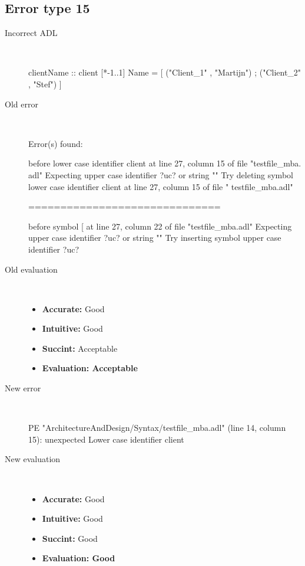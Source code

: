 \hrulefill

\subsection{Error type 15}
  \begin{description}
  \item[Incorrect ADL]~\\
\begin{adl}
clientName :: client [*-1..1] Name =
    [ ("Client_1"      , "Martijn")
    ; ("Client_2"      , "Stef")
    ]\end{adl}
  \item[Old error]~\\
\begin{haskell}
Error(s) found:

before lower case identifier client at line 27, column 15 of file "testfile_mba.
adl"
Expecting upper case identifier ?uc? or string ""
Try deleting symbol lower case identifier client at line 27, column 15 of file "
testfile_mba.adl"

==============================

before symbol [ at line 27, column 22 of file "testfile_mba.adl"
Expecting upper case identifier ?uc? or string ""
Try inserting symbol upper case identifier ?uc?\end{haskell}
  \item[Old evaluation]~\\
    \begin{itemize}
    \item \textbf{Accurate:} Good
    \item \textbf{Intuitive:} Good
    \item \textbf{Succint:} Acceptable
    \item \textbf{Evaluation: Acceptable}
    \end{itemize}
  \item[New error]~\\
\begin{haskell}
PE "ArchitectureAndDesign/Syntax/testfile_mba.adl" (line 14, column 15):
unexpected Lower case identifier client\end{haskell}
  \item[New evaluation]~\\
    \begin{itemize}
    \item \textbf{Accurate:} Good
    \item \textbf{Intuitive:} Good
    \item \textbf{Succint:} Good
    \item \textbf{Evaluation: Good
}
    \end{itemize}
  \end{description}

